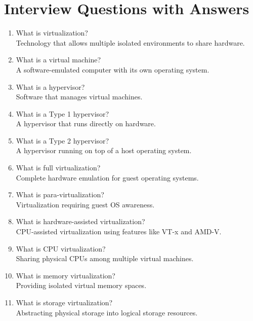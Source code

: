\section{Interview Questions with Answers}

\begin{enumerate}
\item What is virtualization?\\
Technology that allows multiple isolated environments to share hardware.

\item What is a virtual machine?\\
A software-emulated computer with its own operating system.

\item What is a hypervisor?\\
Software that manages virtual machines.

\item What is a Type 1 hypervisor?\\
A hypervisor that runs directly on hardware.

\item What is a Type 2 hypervisor?\\
A hypervisor running on top of a host operating system.

\item What is full virtualization?\\
Complete hardware emulation for guest operating systems.

\item What is para-virtualization?\\
Virtualization requiring guest OS awareness.

\item What is hardware-assisted virtualization?\\
CPU-assisted virtualization using features like VT-x and AMD-V.

\item What is CPU virtualization?\\
Sharing physical CPUs among multiple virtual machines.

\item What is memory virtualization?\\
Providing isolated virtual memory spaces.

\item What is storage virtualization?\\
Abstracting physical storage into logical storage resources.


\end{enumerate}
